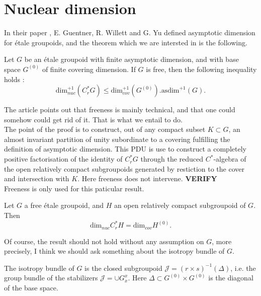 \section{Nuclear dimension}

In their paper \cite{GWY}, E. Guentner, R. Willett and G. Yu defined asymptotic dimension for étale groupoids, and the theorem which we are intersted in is the following.

\begin{thm}
Let $G$ be an étale groupoid with finite asymptotic dimension, and with base space $G^{(0)}$ of finite covering dimension. If $G$ is free, then the following inequality holds :
\[\text{dim}^{+1}_{nuc}(C^*_rG)\leq \text{dim}^{+1}_{cov}(G^{(0)}).\text{asdim}^{+1}(G).\] 
\end{thm}

The article points out that freeness is mainly technical, and that one could somehow could get rid of it. That is what we entail to do. \\

The point of the proof is to construct, out of any compact subset $K\subset G$, an almost invariant partition of unity subordinate to a covering fulfilling the definition of asymptotic dimension. This PDU is use to construct a completely positive factorisation of the identity of $C^*_rG$ through the reduced $C^*$-algebra of the open relatively compact subgroupoids generated by restiction to the cover and intersection with $K$. Here freeness does not intervene. \textbf{VERIFY} \\

Freeness is only used for this paticular result.

\begin{prop}
Let $G$ a free étale groupoid, and $H$ an open relatively compact subgroupoid of $G$. Then 
\[\text{dim}_{nuc} C^*_r H = \text{dim}_{cov} H^{(0)}.\]
\end{prop}

Of course, the result should not hold without any assumption on $G$, more precisely, I think we should ask something about the isotropy bundle of $G$.\\

\begin{definition}
The isotropy bundle of $G$ is the closed subgroupoid $\mathcal J = (r\times s)^{-1}(\Delta)$, i.e. the group bundle of the stabilizers $\mathcal J = \cup G_x^x$. Here $\Delta\subset G^{(0)}\times G^{(0)}$ is the diagonal of the base space. 
\end{definition}

